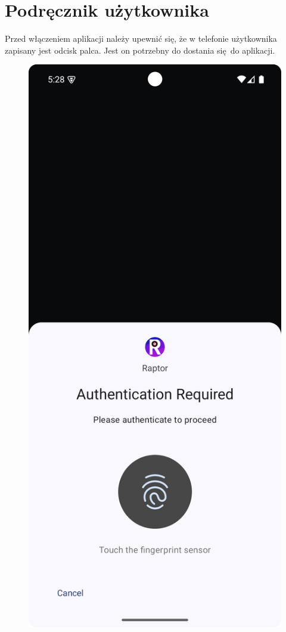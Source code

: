 	\newpage
\section{Podręcznik użytkownika}  %

Przed włączeniem aplikacji należy upewnić się, że w telefonie użytkownika zapisany jest odcisk palca. Jest on potrzebny do dostania się do aplikacji. 

\begin{figure}[H]
	\centering
	\includegraphics[width=1\textwidth]{images/usage_fingerprint.png}
	\caption{}
	\label{fig:usage_fingerprint}
\end{figure}

